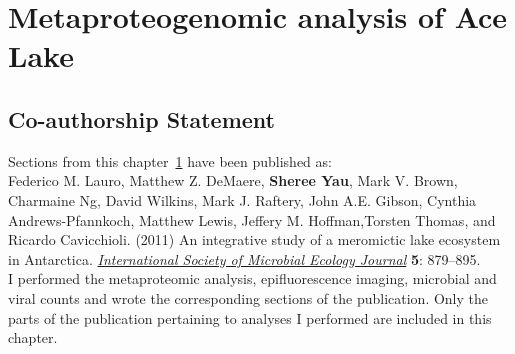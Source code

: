 \chapter{Metaproteogenomic analysis of Ace Lake}
\label{ch:ace}

\section*{Co-authorship Statement}

Sections from this chapter~\ref{ch:ace} have been published as:\\

Federico M. Lauro, Matthew Z. DeMaere, \textbf{Sheree Yau}, Mark V. Brown, Charmaine Ng,
David Wilkins, Mark J. Raftery, John A.E. Gibson, Cynthia Andrews-Pfannkoch, Matthew Lewis,
Jeffery M. Hoffman,Torsten Thomas, and Ricardo Cavicchioli. (2011)
An integrative study of a meromictic lake ecosystem in Antarctica.
\textit{\underline{International Society of Microbial Ecology Journal}}
\textbf{5}: 879--895.\\

I performed the metaproteomic analysis, epifluorescence imaging,
microbial and viral counts and wrote the corresponding sections of the publication.
Only the parts of the publication pertaining to analyses I performed are included in this chapter.
\newpage

